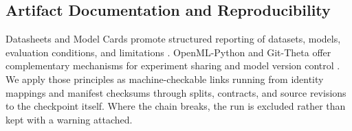 \subsection{Artifact Documentation and Reproducibility}

Datasheets and Model Cards promote structured reporting of datasets, models, evaluation conditions, and limitations \cite{gebru_datasheets_2021,mitchell_model_cards_2019}. OpenML-Python and Git-Theta offer complementary mechanisms for experiment sharing and model version control \cite{feurer_openml_python_2021,kandpal_git_theta_2023}. We apply those principles as machine-checkable links running from identity mappings and manifest checksums through splits, contracts, and source revisions to the checkpoint itself. Where the chain breaks, the run is excluded rather than kept with a warning attached.